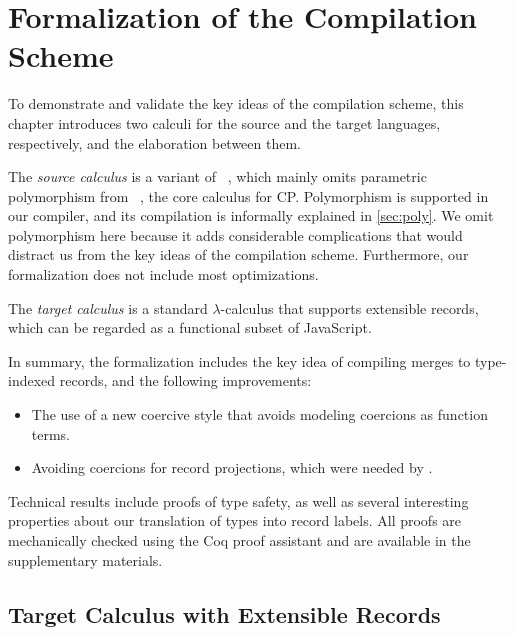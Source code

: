 \chapter{Formalization of the Compilation Scheme} \label{ch:calculi}

To demonstrate and validate the key ideas of the compilation scheme, this
chapter introduces two calculi for the source and the target languages,
respectively, and the elaboration between them.

The \emph{source calculus} is a variant of
\lambdaiplus~\citep{bi2018essence,huang2021taming}, which mainly omits
parametric polymorphism from \fiplus~\citep{bi2019distributive,fan2022direct},
the core calculus for CP. Polymorphism is supported in our compiler, and its
compilation is informally explained in \autoref{sec:poly}. We omit polymorphism
here because it adds considerable complications that would distract us from the
key ideas of the compilation scheme. Furthermore, our formalization does not
include most optimizations.

The \emph{target calculus} \lambdar is a standard $\lambda$-calculus that
supports extensible records, which can be regarded as a functional subset of
JavaScript.

In summary, the formalization includes the key idea of compiling merges to
type-indexed records, and the following improvements:
\begin{itemize}
\item The use of a new coercive style that avoids modeling coercions as function
      terms.
\item Avoiding coercions for record projections, which were needed by
      \citet{fan2022direct}.
\end{itemize}
Technical results include proofs of type safety, as well as several interesting
properties about our translation of types into record labels. All proofs are
mechanically checked using the Coq proof assistant and are available in the
supplementary materials.

\section{Target Calculus with Extensible Records}

